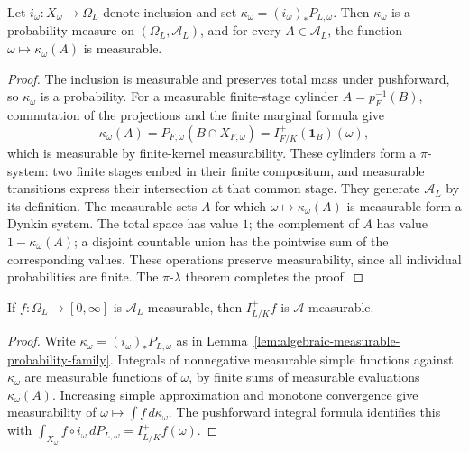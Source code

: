 \begin{lemma}\label{lem:algebraic-measurable-probability-family}
\leanok
{}
Let $i_\omega:X_\omega\to\Omega_L$ denote inclusion and set
$\kappa_\omega=(i_\omega)_*P_{L,\omega}$. Then $\kappa_\omega$
is a probability measure on $(\Omega_L,\mathcal A_L)$, and for every
$A\in\mathcal A_L$, the function $\omega\mapsto\kappa_\omega(A)$
is measurable.
\end{lemma}
\begin{proof}
The inclusion is measurable and preserves total mass under pushforward,
so $\kappa_\omega$ is a probability. For a measurable finite-stage
cylinder $A=p_F^{-1}(B)$, commutation of the projections and the finite
marginal formula give
\[
 \kappa_\omega(A)=P_{F,\omega}(B\cap X_{F,\omega})
 =I^+_{F/K}(\mathbf1_B)(\omega),
\]
which is measurable by finite-kernel measurability. These cylinders
form a $\pi$-system: two finite stages embed in their finite compositum,
and measurable transitions express their intersection at that common
stage. They generate $\mathcal A_L$ by its definition.
The measurable sets $A$ for which $\omega\mapsto\kappa_\omega(A)$
is measurable form a Dynkin system. The total space has value $1$;
the complement of $A$ has value $1-\kappa_\omega(A)$; a disjoint
countable union has the pointwise sum of the corresponding values.
These operations preserve measurability, since all individual
probabilities are finite. The $\pi$-$\lambda$ theorem completes the proof.
\end{proof}

\begin{proposition}\label{prop:algebraic-kernel-measurable}
\leanok
{}
If $f:\Omega_L\to[0,\infty]$ is $\mathcal A_L$-measurable, then
$I^+_{L/K}f$ is $\mathcal A$-measurable.
\end{proposition}
\begin{proof}
Write $\kappa_\omega=(i_\omega)_*P_{L,\omega}$ as in
Lemma~\ref{lem:algebraic-measurable-probability-family}. Integrals of
nonnegative measurable simple functions against $\kappa_\omega$
are measurable functions of $\omega$, by finite sums of measurable
evaluations $\kappa_\omega(A)$. Increasing simple approximation and
monotone convergence give measurability of $\omega\mapsto\int f\,d\kappa_\omega$.
The pushforward integral formula identifies this with
$\int_{X_\omega}f\circ i_\omega\,dP_{L,\omega}=I^+_{L/K}f(\omega)$.
\end{proof}

